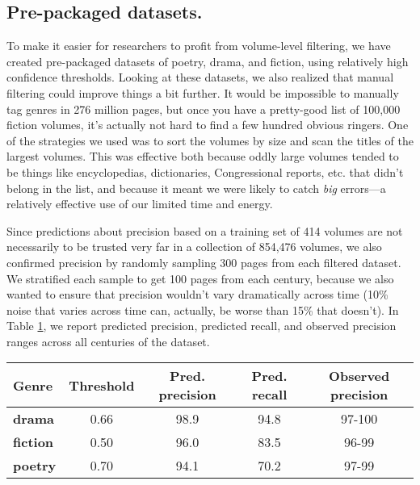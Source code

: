 \documentclass[paper=a4, fontsize=12pt]{scrartcl}
\numberwithin{equation}{section}		%
\numberwithin{figure}{section}			%
\numberwithin{table}{section}				%
\begin{document}
\subsection{Pre-packaged datasets.}

To make it easier for researchers to profit from volume-level filtering, we have created pre-packaged datasets of poetry, drama, and fiction, using relatively high confidence thresholds. Looking at these datasets, we also realized that manual filtering could improve things a bit further. It would be impossible to manually tag genres in 276 million pages, but once you have a pretty-good list of 100,000 fiction volumes, it's actually not hard to find a few hundred obvious ringers. One of the strategies we used was to sort the volumes by size and scan the titles of the largest volumes. This was effective both because oddly large volumes tended to be things like encyclopedias, dictionaries, Congressional reports, etc. that didn't belong in the list, and because it meant we were likely to catch \textit{big} errors---a relatively effective use of our limited time and energy.

Since predictions about precision based on a training set of 414 volumes are not necessarily to be trusted very far in a collection of 854,476 volumes, we also confirmed precision by randomly sampling 300 pages from each filtered dataset. We stratified each sample to get 100 pages from each century, because we also wanted to ensure that precision wouldn't vary dramatically across time (10\% noise that varies across time can, actually, be worse than 15\% that doesn't). In Table \ref{filteredtable}, we report predicted precision, predicted recall, and observed precision ranges across all centuries of the dataset.

\vspace{5mm}
\begin{table}[h]
\begin{tabular}{@{}lcccc@{}}
\toprule
\textbf{Genre}   & \textbf{Threshold} & \textbf{Pred. precision} & \textbf{Pred. recall} & \textbf{Observed precision} \\ \midrule
\textbf{drama}   & 0.66               & 98.9                     & 94.8                  & 97-100                      \\
\textbf{fiction} & 0.50               & 96.0                     & 83.5                  & 96-99                       \\
\textbf{poetry}  & 0.70               & 94.1                     & 70.2                  & 97-99                      
\end{tabular}
\label{filteredtable}
\end{table}
\vspace{5mm}
\end{document}
